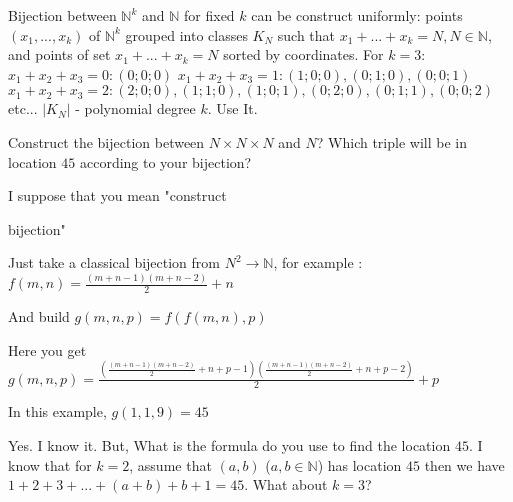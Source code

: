 \begin{solution}
	Bijection between $\mathbb{N}^k$ and $\mathbb{N}$ for fixed $k$ can be construct uniformly: points $(x_1,...,x_k)$ of $\mathbb{N}^k$ grouped into classes $K_N$ such that $x_1+...+x_k=N, N \in \mathbb{N}$, and points of set $x_1+...+x_k=N$ sorted by coordinates.
For $k=3$:
$x_1+x_2+x_3=0 : (0;0;0)$
$x_1+x_2+x_3=1 : (1;0;0),(0;1;0),(0;0;1)$
$x_1+x_2+x_3=2 : (2;0;0),(1;1;0),(1;0;1),(0;2;0),(0;1;1),(0;0;2)$
etc...
$|K_N|$ - polynomial degree $k$. Use It.
\end{solution}



\begin{solution}
	\begin{tcolorbox}Construct the bijection between $N \times N \times N$ and $N$?
Which triple will be in location $45$ according to your  bijection?\end{tcolorbox}
I suppose that you mean "construct  bijection"

Just take a classical bijection from $%
N^2\to\mathbb N$, for example : $f(m,n)=\frac{(m+n-1)(m+n-2)}2+n$

And build $g(m,n,p)=f(f(m,n),p)$

Here you get $g(m,n,p)=\frac{(\frac{(m+n-1)(m+n-2)}2+n+p-1)(\frac{(m+n-1)(m+n-2)}2+n+p-2)}2+p$

In this example, $g(1,1,9)=45$
\end{solution}



\begin{solution}
	Yes. I know it. But, What is the formula do you use to find the location $45$. I know that for $k=2$, assume that $(a,b)$ ($a,b \in \mathbb{N}$) has location $45$ then we have $1+2+3+...+(a+b)+b+1=45$. What about $k=3$?
\end{solution}



